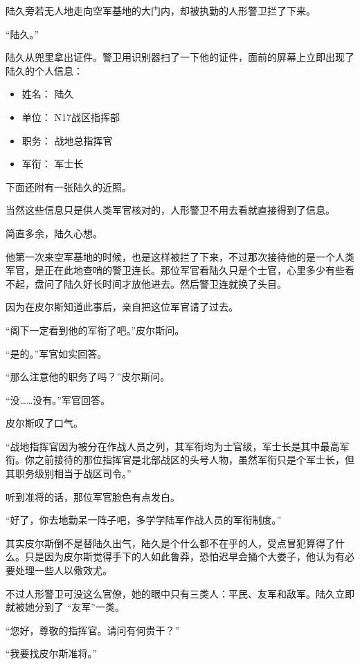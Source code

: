 陆久旁若无人地走向空军基地的大门内，却被执勤的人形警卫拦了下来。

“陆久。”

陆久从兜里拿出证件。警卫用识别器扫了一下他的证件，面前的屏幕上立即出现了陆久的个人信息：

\begin{itemize}
    \item[]姓名： 陆久
    \item[]单位： N17战区指挥部
    \item[]职务： 战地总指挥官
    \item[]军衔： 军士长
\end{itemize}



下面还附有一张陆久的近照。

当然这些信息只是供人类军官核对的，人形警卫不用去看就直接得到了信息。

简直多余，陆久心想。

他第一次来空军基地的时候，也是这样被拦了下来，不过那次接待他的是一个人类军官，是正在此地查哨的警卫连长。那位军官看陆久只是个士官，心里多少有些看不起，盘问了陆久好长时间才放他进去。然后警卫连就换了头目。

因为在皮尔斯知道此事后，亲自把这位军官请了过去。

“阁下一定看到他的军衔了吧。”皮尔斯问。

“是的。”军官如实回答。

“那么注意他的职务了吗？”皮尔斯问。

“没……没有。”军官回答。

皮尔斯叹了口气。

“战地指挥官因为被分在作战人员之列，其军衔均为士官级，军士长是其中最高军衔。你之前接待的那位指挥官是北部战区的头号人物，虽然军衔只是个军士长，但其职务级别相当于战区司令。”

听到准将的话，那位军官脸色有点发白。

“好了，你去地勤呆一阵子吧，多学学陆军作战人员的军衔制度。”

其实皮尔斯倒不是替陆久出气，陆久是个什么都不在乎的人，受点冒犯算得了什么。只是因为皮尔斯觉得手下的人如此鲁莽，恐怕迟早会捅个大娄子，他认为有必要处理一些人以儆效尤。

不过人形警卫可没这么官僚，她的眼中只有三类人：平民、友军和敌军。陆久立即就被她分到了 “友军”一类。

“您好，尊敬的指挥官。请问有何贵干？”

“我要找皮尔斯准将。”

